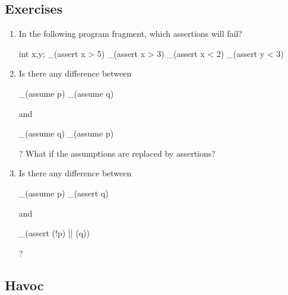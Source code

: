 \subsection*{Exercises}
\begin{enumerate}
\item
In the following program fragment, which assertions will fail?
\begin{VCC}
int x,y; 
_(assert x > 5) 
_(assert x > 3) 
_(assert x < 2) 
_(assert y < 3)
\end{VCC}
\item
Is there any difference between 
\begin{VCC}
_(assume p)
_(assume q)
\end{VCC}
and 
\begin{VCC}
_(assume q) 
_(assume p)
\end{VCC}
? What if the assumptions are replaced by assertions?
\item
Is there any difference between
\begin{VCC}
_(assume p)
_(assert q)
\end{VCC}
and 
\begin{VCC}
_(assert (!p) || (q))
\end{VCC}
? 

\end{enumerate}

\subsection{Havoc}

